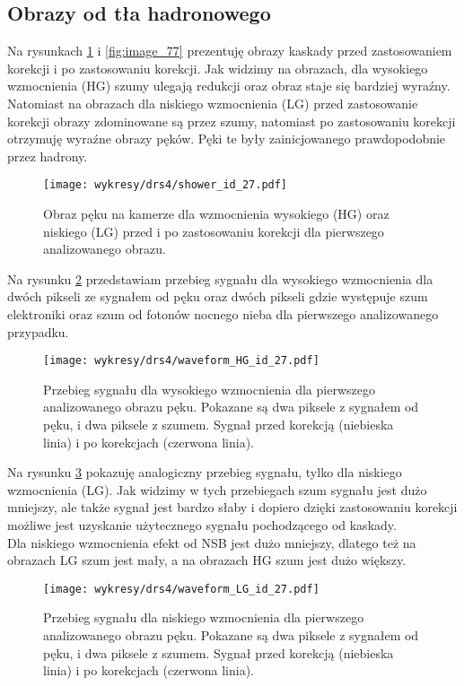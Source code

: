 \documentclass[a4paper,11pt,twoside]{article}
\begin{document}
\subsection{Obrazy od tła hadronowego}
Na rysunkach \ref{fig:image_27_map} i \ref{fig:image_77} prezentuję obrazy kaskady przed zastosowaniem korekcji i po zastosowaniu korekcji. Jak widzimy na obrazach, dla wysokiego wzmocnienia (HG) szumy ulegają redukcji oraz obraz staje się bardziej wyraźny. Natomiast na obrazach dla niskiego wzmocnienia (LG) przed zastosowanie korekcji obrazy zdominowane są przez szumy, natomiast po zastosowaniu korekcji otrzymuję wyraźne obrazy pęków. Pęki te były zainicjowanego prawdopodobnie przez hadrony. 
\begin{figure}[H] 
\centering
\texttt{[image: wykresy/drs4/shower\_id\_27.pdf]}
\caption{Obraz pęku na kamerze dla wzmocnienia wysokiego (HG) oraz niskiego (LG) przed i po zastosowaniu korekcji dla pierwszego analizowanego obrazu.}
\label{fig:image_27_map}
\end{figure}
Na rysunku \ref{fig:waveform_27_hg} przedstawiam przebieg sygnału dla wysokiego wzmocnienia dla dwóch pikseli ze sygnałem od pęku oraz dwóch pikseli gdzie występuje szum elektroniki oraz szum od fotonów nocnego nieba dla pierwszego analizowanego przypadku. 
\begin{figure}[H] 
\centering
\texttt{[image: wykresy/drs4/waveform\_HG\_id\_27.pdf]}
\caption{Przebieg sygnału dla wysokiego wzmocnienia dla pierwszego analizowanego obrazu pęku. Pokazane są dwa piksele z sygnałem od pęku, i dwa piksele z szumem. Sygnał przed korekcją (niebieska linia) i po korekcjach (czerwona linia).}
\label{fig:waveform_27_hg}
\end{figure}
Na rysunku \ref{fig:waveform_27_lg} pokazuję analogiczny przebieg sygnału, tylko dla niskiego wzmocnienia (LG). Jak widzimy w tych przebiegach szum sygnału jest dużo mniejszy, ale także sygnał jest bardzo słaby i dopiero dzięki zastosowaniu korekcji możliwe jest uzyskanie użytecznego sygnału pochodzącego od kaskady. \\
Dla niskiego wzmocnienia efekt od NSB jest dużo mniejszy, dlatego też na obrazach LG szum jest mały, a na obrazach HG szum jest dużo większy.
\begin{figure}[H] 
\centering
\texttt{[image: wykresy/drs4/waveform\_LG\_id\_27.pdf]}
\caption{Przebieg sygnału dla niskiego wzmocnienia dla pierwszego analizowanego obrazu pęku. Pokazane są dwa piksele z sygnałem od pęku, i dwa piksele z szumem. Sygnał przed korekcją (niebieska linia) i po korekcjach (czerwona linia).}
\label{fig:waveform_27_lg}
\end{figure}
\end{document}
